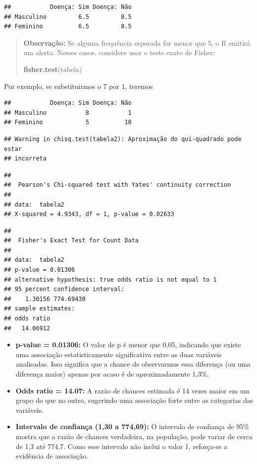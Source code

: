 \documentclass[
]{book}
\newenvironment{Shaded}{\begin{snugshade}}{\end{snugshade}}
\newcommand{\FunctionTok}[1]{\textcolor[rgb]{0.13,0.29,0.53}{\textbf{#1}}}
\newcommand{\NormalTok}[1]{#1}
\begin{document}
\begin{verbatim}
##           Doença: Sim Doença: Não
## Masculino         6.5         8.5
## Feminino          6.5         8.5
\end{verbatim}

\begin{quote}
\textbf{Observação:} Se alguma frequência esperada for menor que 5, o R emitirá um alerta. Nesses casos, considere usar o teste exato de Fisher:

\begin{Shaded}
\begin{Highlighting}[]
\FunctionTok{fisher.test}\NormalTok{(tabela)}
\end{Highlighting}
\end{Shaded}
\end{quote}

Por exemplo, se substituirmos o 7 por 1, teremos

\begin{verbatim}
##           Doença: Sim Doença: Não
## Masculino           8           1
## Feminino            5          10
\end{verbatim}

\begin{verbatim}
## Warning in chisq.test(tabela2): Aproximação do qui-quadrado pode estar
## incorreta
\end{verbatim}

\begin{verbatim}
## 
##  Pearson's Chi-squared test with Yates' continuity correction
## 
## data:  tabela2
## X-squared = 4.9343, df = 1, p-value = 0.02633
\end{verbatim}

\begin{verbatim}
## 
##  Fisher's Exact Test for Count Data
## 
## data:  tabela2
## p-value = 0.01306
## alternative hypothesis: true odds ratio is not equal to 1
## 95 percent confidence interval:
##    1.30156 774.69430
## sample estimates:
## odds ratio 
##   14.06912
\end{verbatim}

\begin{itemize}
\item
  \textbf{p-value = 0.01306:} O valor de p é menor que 0,05, indicando que existe uma associação estatisticamente significativa entre as duas variáveis analisadas. Isso significa que a chance de observarmos essa diferença (ou uma diferença maior) apenas por acaso é de aproximadamente 1,3\%.
\item
  \textbf{Odds ratio = 14.07:} A razão de chances estimada é 14 vezes maior em um grupo do que no outro, sugerindo uma associação forte entre as categorias das variáveis.
\item
  \textbf{Intervalo de confiança (1,30 a 774,69):} O intervalo de confiança de 95\% mostra que a razão de chances verdadeira, na população, pode variar de cerca de 1,3 até 774,7. Como esse intervalo não inclui o valor 1, reforça-se a evidência de associação.
\end{itemize}
\end{document}
